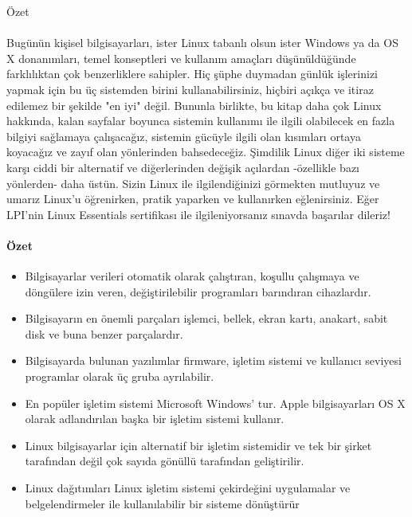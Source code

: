 \documentclass[10pt,a5paper]{book}
\begin{document}
\begin{section}{Özet}
\paragraph{}{Bugünün kişisel bilgisayarları, ister Linux tabanlı olsun ister Windows ya da OS X donanımları, temel konseptleri ve kullanım amaçları düşünüldüğünde farklılıktan çok benzerliklere sahipler. Hiç şüphe duymadan günlük işlerinizi yapmak için bu üç sistemden birini kullanabilirsiniz, hiçbiri açıkça ve itiraz edilemez bir şekilde "en iyi" değil. Bununla birlikte, bu kitap daha çok Linux hakkında, kalan sayfalar boyunca sistemin kullanımı ile ilgili olabilecek en fazla bilgiyi sağlamaya çalışacağız, sistemin gücüyle ilgili olan kısımları ortaya koyacağız ve zayıf olan yönlerinden bahsedeceğiz. Şimdilik Linux diğer iki sisteme karşı ciddi bir alternatif ve diğerlerinden değişik açılardan -özellikle bazı yönlerden- daha üstün. Sizin Linux ile ilgilendiğinizi görmekten mutluyuz ve umarız Linux'u öğrenirken, pratik yaparken ve kullanırken eğlenirsiniz. Eğer LPI'nin Linux Essentials sertifikası ile ilgileniyorsanız sınavda başarılar dileriz!}
\paragraph{Özet}{}
\begin{itemize}
\item Bilgisayarlar verileri otomatik olarak çalıştıran, koşullu çalışmaya ve döngülere izin veren, değiştirilebilir programları barındıran cihazlardır.
\item Bilgisayarın en önemli parçaları işlemci, bellek, ekran kartı, anakart, sabit disk ve buna benzer parçalardır. 
\item Bilgisayarda bulunan yazılımlar firmware, işletim sistemi ve kullanıcı seviyesi programlar olarak üç gruba ayrılabilir. 
\item En popüler işletim sistemi Microsoft Windows' tur. Apple bilgisayarları OS X olarak adlandırılan başka bir işletim sistemi kullanır.
\item Linux bilgisayarlar için alternatif bir işletim sistemidir ve tek bir şirket tarafından değil çok sayıda gönüllü tarafından geliştirilir. 
\item Linux dağıtımları Linux işletim sistemi çekirdeğini uygulamalar ve belgelendirmeler ile kullanılabilir bir sisteme dönüştürür
\end{itemize}
\end{section}
\end{document}
